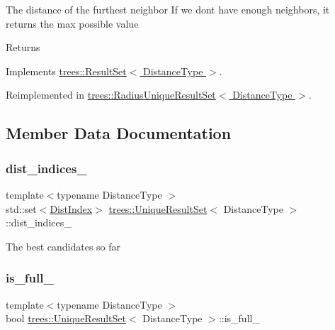 The distance of the furthest neighbor If we don\textquotesingle{}t have enough neighbors, it returns the max possible value \begin{DoxyReturn}{Returns}

\end{DoxyReturn}


Implements \hyperlink{classtrees_1_1_result_set}{trees\+::\+Result\+Set$<$ Distance\+Type $>$}.



Reimplemented in \hyperlink{classtrees_1_1_radius_unique_result_set_af0f7ec26a6515cb085df64a43afe433c}{trees\+::\+Radius\+Unique\+Result\+Set$<$ Distance\+Type $>$}.



\subsection{Member Data Documentation}
\mbox{\label{classtrees_1_1_unique_result_set_a3a3dd371f4861f0addcfabe8c68ec11c}} 
\subsubsection{\texorpdfstring{dist\+\_\+indices\+\_\+}{dist\_indices\_}}
{\footnotesize\ttfamily template$<$typename Distance\+Type $>$ \\
std\+::set$<$\hyperlink{structtrees_1_1_unique_result_set_1_1_dist_index}{Dist\+Index}$>$ \hyperlink{classtrees_1_1_unique_result_set}{trees\+::\+Unique\+Result\+Set}$<$ Distance\+Type $>$\+::dist\+\_\+indices\+\_\+\hspace{0.3cm}{\ttfamily [protected]}}

The best candidates so far \mbox{\label{classtrees_1_1_unique_result_set_a4d9baa438af8d132f30676f25c5900b4}} 
\subsubsection{\texorpdfstring{is\+\_\+full\+\_\+}{is\_full\_}}
{\footnotesize\ttfamily template$<$typename Distance\+Type $>$ \\
bool \hyperlink{classtrees_1_1_unique_result_set}{trees\+::\+Unique\+Result\+Set}$<$ Distance\+Type $>$\+::is\+\_\+full\+\_\+\hspace{0.3cm}{\ttfamily [protected]}}

